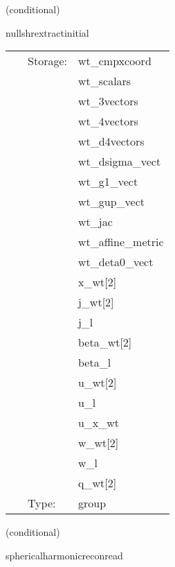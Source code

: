 \vspace{5mm}

   (conditional) 

\hspace{5mm} nullshrextractinitial 

\hspace{5mm}{\it group of the waveform extraction initialization } 


\hspace{5mm}

 \begin{tabular*}{160mm}{cll} 
~ & Storage:  & wt\_cmpxcoord \\ 
~& ~ &wt\_scalars\\ 
~& ~ &wt\_3vectors\\ 
~& ~ &wt\_4vectors\\ 
~& ~ &wt\_d4vectors\\ 
~& ~ &wt\_dsigma\_vect\\ 
~& ~ &wt\_g1\_vect\\ 
~& ~ &wt\_gup\_vect\\ 
~& ~ &wt\_jac\\ 
~& ~ &wt\_affine\_metric\\ 
~& ~ &wt\_deta0\_vect\\ 
~& ~ &x\_wt[2]\\ 
~& ~ &j\_wt[2]\\ 
~& ~ &j\_l\\ 
~& ~ &beta\_wt[2]\\ 
~& ~ &beta\_l\\ 
~& ~ &u\_wt[2]\\ 
~& ~ &u\_l\\ 
~& ~ &u\_x\_wt\\ 
~& ~ &w\_wt[2]\\ 
~& ~ &w\_l\\ 
~& ~ &q\_wt[2]\\ 
~ & Type:  & group \\ 
\end{tabular*} 


\vspace{5mm}

   (conditional) 

\hspace{5mm} sphericalharmonicreconread 

\hspace{5mm}{\it schedule group for reconstructing initial world-tube data } 


\hspace{5mm}


